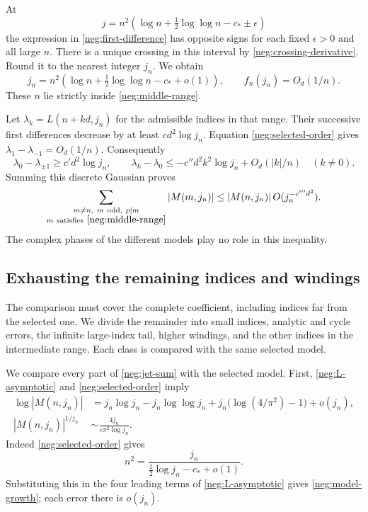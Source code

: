 \documentclass[11pt]{article}
\numberwithin{equation}{section}
\theoremstyle{definition}
\begin{document}
At
\[
 j=n^2\left(\log n+\tfrac12\log\log n-c_*\pm\epsilon\right)
 \]
the expression in \eqref{neg:first-difference} has opposite
signs for each fixed \(\epsilon>0\) and all large \(n\).
There is a unique crossing in this interval by
\eqref{neg:crossing-derivative}.  Round it to the nearest
integer \(j_n\).  We obtain
\begin{equation}
 j_n=n^2\left(\log n+\tfrac12\log\log n-c_*+o(1)\right),
 \qquad f_n(j_n)=O_d(1/n).
 \label{neg:selected-order}
\end{equation}
These \(n\) lie strictly inside \eqref{neg:middle-range}.

Let \(\lambda_k=L(n+kd,j_n)\) for the admissible indices
in that range.  Their successive first differences decrease
by at least \(c d^2\log j_n\).  Equation
\eqref{neg:selected-order} gives
\(\lambda_1-\lambda_{-1}=O_d(1/n)\).
Consequently
\[
 \lambda_0-\lambda_{\pm1}\ge c'd^2\log j_n,
 \qquad
 \lambda_k-\lambda_0
       \le-c''d^2 k^2\log j_n+O_d(|k|/n)\quad(k\ne0).
 \]
Summing this discrete Gaussian proves
\begin{equation}
 \sum_{\substack{m\ne n,\ m\ {\rm odd},\ p\mid m\\
                         m\ {\rm satisfies}\ \eqref{neg:middle-range}}}
       |M(m,j_n)|
 \le |M(n,j_n)|\,O(j_n^{-c'''d^2}).
 \label{neg:single-index}
\end{equation}
The complex phases of the different models play no role in
this inequality.

\subsection{Exhausting the remaining indices and windings}
\label{neg:exhaustion}

The comparison must cover the complete coefficient, including
indices far from the selected one. We divide the remainder into
small indices, analytic and cycle errors, the infinite large-index
tail, higher windings, and the other indices in the intermediate
range. Each class is compared with the same selected model.

We compare every part of \eqref{neg:jet-sum} with the selected
model.  First, \eqref{neg:L-asymptotic} and
\eqref{neg:selected-order} imply
\begin{align}
 \log|M(n,j_n)|
 &=j_n\log j_n-j_n\log\log j_n
          +j_n\bigl(\log(4/\pi^2)-1\bigr)+o(j_n),
 \label{neg:model-growth}\\
 |M(n,j_n)|^{1/j_n}
 &\sim\frac{4j_n}{e\pi^2\log j_n}.
 \label{neg:model-root}
\end{align}
Indeed \eqref{neg:selected-order} gives
\[
 n^2=\frac{j_n}{\tfrac12\log j_n-c_*+o(1)}.
 \]
Substituting this in the four leading terms of
\eqref{neg:L-asymptotic} gives \eqref{neg:model-growth};
each error there is \(o(j_n)\).
\end{document}
